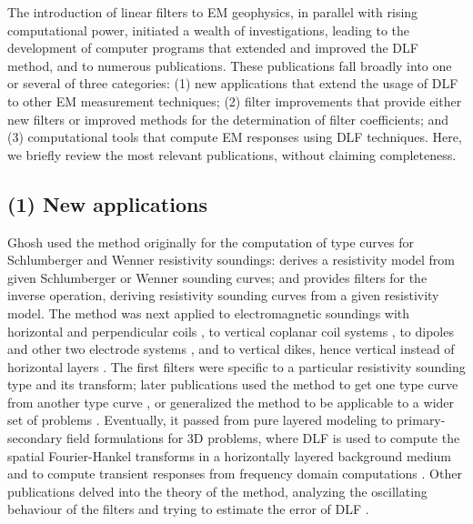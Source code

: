 \documentclass[a4paper, twoside, parskip, 10pt]{scrartcl}
\begin{document}
\begin{multicols}{2}
The introduction of linear filters to EM geophysics, in parallel with rising
computational power, initiated a wealth of investigations, leading to the
development of computer programs that extended and improved the DLF method, and
to numerous publications. These publications fall broadly into one or several
of three categories: (1) new applications that extend the usage of DLF to other
EM measurement techniques; (2) filter improvements that provide either new
filters or improved methods for the determination of filter coefficients; and
(3) computational tools that compute EM responses using DLF techniques. Here,
we briefly review the most relevant publications, without claiming
completeness.

\subsection{(1) New applications}

Ghosh used the method originally for the computation of type curves for
Schlumberger and Wenner resistivity soundings: \cite{GP.71.Ghosh} derives a
resistivity model from given Schlumberger or Wenner sounding curves; and
\citet{GP.71.Ghoshb} provides filters for the inverse operation, deriving
resistivity sounding curves from a given resistivity model. The method was next
applied to electromagnetic soundings with horizontal and perpendicular coils
\citep{GP.72.Koefoed}, to vertical coplanar coil systems \citep{GP.73.Verma},
to dipoles and other two electrode systems \citep{GP.74.Das, GP.74.Dasb,
GP.80.Das, GEO.94.Sorensen}, and to vertical dikes, hence vertical instead of
horizontal layers \citep{GEO.75.Niwas}. The first filters were specific to a
particular resistivity sounding type and its transform; later publications used
the method to get one type curve from another type curve \citep{GP.77.Kumar,
GP.78.Kumar}, or generalized the method to be applicable to a wider set of
problems \citep{EXG.80.Davis, GXP.81.Das, GEO.84.Das, GP.84.ONeill}.
Eventually, it passed from pure layered modeling to primary-secondary field
formulations for 3D problems, where DLF is used to compute the spatial
Fourier-Hankel transforms in a horizontally layered background medium and to
compute transient responses from frequency domain computations
\citep{GJI.81.Das, GJI.82.Das, GEO.84.Anderson, GEO.86.Newman,
MGS.17.Kruglyakov}. Other publications delved into the theory of the method,
analyzing the oscillating behaviour of the filters and trying to estimate the
error of DLF \citep{GP.72.Koefoedb, GP.76.Koefoedb, GP.79.Johansen,
GP.90.Christensen}.


\end{multicols}
\end{document}
